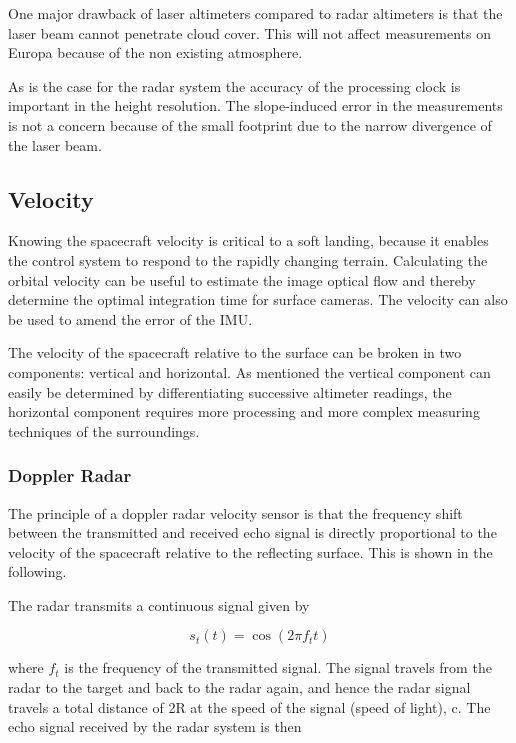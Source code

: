 One major drawback of laser altimeters compared to radar altimeters is that the laser beam cannot penetrate cloud cover. This will not affect measurements on Europa because of the non existing atmosphere. 

As is the case for the radar system the accuracy of the processing clock is important in the height resolution. The slope-induced error in the measurements is not a concern because of the small footprint due to the narrow divergence of the laser beam.

\subsection{Velocity}

Knowing the spacecraft velocity is critical to a soft landing, because it enables the control system to respond to the rapidly changing terrain. Calculating the orbital velocity can be useful to estimate the image optical flow and thereby determine the optimal integration time for surface cameras. \cite{allessandro} The velocity can also be used to amend the error of the IMU.

The velocity of the spacecraft relative to the surface can be broken in two components: vertical and horizontal. As mentioned the vertical component can easily be determined by differentiating successive altimeter readings, the horizontal component requires more processing and more complex measuring techniques of the surroundings. 

\subsubsection{Doppler Radar}
The principle of a doppler radar velocity sensor is that the frequency shift between the transmitted and received echo signal is directly proportional to the velocity of the spacecraft relative to the reflecting surface. This is shown in the following. 

The radar transmits a continuous signal given by

\begin{equation}
s_t(t)=\cos (2 \pi f_t t)
\end{equation}


where $f_t$ is the frequency of the transmitted signal. The signal travels
from the radar to the target and back to the radar again, and hence the radar signal
travels a total distance of 2R at the speed of the signal (speed of light), c. The echo signal received by the radar
system is then

